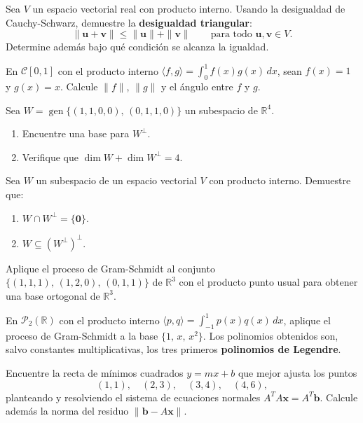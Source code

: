 \begin{prob}
Sea $V$ un espacio vectorial real con producto interno. Usando la desigualdad de Cauchy-Schwarz, demuestre la \textbf{desigualdad triangular}:
\[
\|\mathbf{u}+\mathbf{v}\| \leq \|\mathbf{u}\| + \|\mathbf{v}\| \qquad \text{para todo } \mathbf{u},\mathbf{v} \in V.
\]
Determine además bajo qué condición se alcanza la igualdad.
\end{prob}

\begin{prob}
En $\mathcal{C}[0,1]$ con el producto interno $\langle f, g \rangle = \int_0^1 f(x)g(x)\,dx$, sean $f(x)=1$ y $g(x)=x$. Calcule $\|f\|$, $\|g\|$ y el ángulo entre $f$ y $g$.
\end{prob}

\begin{prob}
Sea $W = \operatorname{gen}\{(1,1,0,0),\, (0,1,1,0)\}$ un subespacio de $\mathbb{R}^4$.
\begin{enumerate}[$a)$]
\item Encuentre una base para $W^{\perp}$.
\item Verifique que $\dim W + \dim W^{\perp} = 4$.
\end{enumerate}
\end{prob}

\begin{prob}
Sea $W$ un subespacio de un espacio vectorial $V$ con producto interno. Demuestre que:
\begin{enumerate}[$a)$]
\item $W \cap W^{\perp} = \{\mathbf{0}\}$.
\item $W \subseteq (W^{\perp})^{\perp}$.
\end{enumerate}
\end{prob}

\begin{prob}
Aplique el proceso de Gram-Schmidt al conjunto $\{(1,1,1),\, (1,2,0),\, (0,1,1)\}$ de $\mathbb{R}^3$ con el producto punto usual para obtener una base ortogonal de $\mathbb{R}^3$.
\end{prob}

\begin{prob}
En $\mathcal{P}_2(\mathbb{R})$ con el producto interno $\langle p, q \rangle = \int_{-1}^{1} p(x)q(x)\,dx$, aplique el proceso de Gram-Schmidt a la base $\{1,\, x,\, x^2\}$. Los polinomios obtenidos son, salvo constantes multiplicativas, los tres primeros \textbf{polinomios de Legendre}.
\end{prob}

\begin{prob}
Encuentre la recta de mínimos cuadrados $y = mx + b$ que mejor ajusta los puntos
\[
(1,1), \quad (2,3), \quad (3,4), \quad (4,6),
\]
planteando y resolviendo el sistema de ecuaciones normales $A^TA\mathbf{x} = A^T\mathbf{b}$. Calcule además la norma del residuo $\|\mathbf{b} - A\mathbf{x}\|$.
\end{prob}

